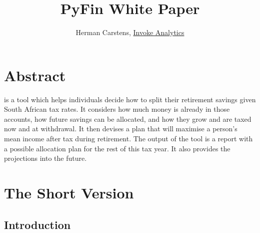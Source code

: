 \documentclass[a4paper, justified]{tufte-handout}
\title{PyFin White Paper}
\author[]{Herman Carstens, \href{http://invokeanalytics.co.za/}{Invoke Analytics}}
\newcommand{\blankpage}{\newpage\hbox{}\thispagestyle{empty}\newpage}
\begin{document}



\maketitle


\begin{fullwidth}

\setlength{\parindent}{0pt}



\end{fullwidth}








\section{Abstract} \label{ch:intro}
 is a tool which helps individuals decide how to split their retirement savings given South African tax rates. It considers how much money is already in those accounts, how future savings can be allocated, and how they grow and are taxed now and at withdrawal. It then devises a plan that will maximise a person's mean income after tax during retirement. The output of the tool is a report with a possible allocation plan for the rest of this tax year. It also provides the projections into the future.

\section{The Short Version}
\subsection{Introduction}
\end{document}
